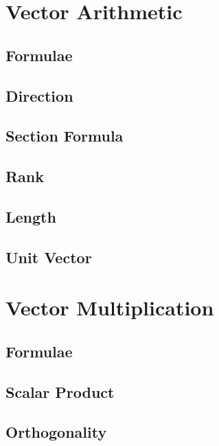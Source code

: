 \documentclass[journal]{IEEEtran}
\begin{document}
\newpage


\tableofcontents

\newpage
\onecolumn


\renewcommand{\thetable}{\theenumi}


\section{Vector Arithmetic}
\subsection{Formulae}

\subsection{Direction}

\subsection{Section Formula}

\subsection{Rank}

\subsection{Length}

\subsection{Unit Vector}

%
\newpage
\section{Vector Multiplication}
\subsection{Formulae}

\subsection{Scalar Product}

\subsection{Orthogonality}

\end{document}

